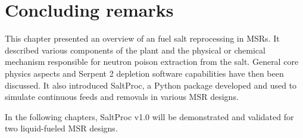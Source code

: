 \section{Concluding remarks}
This chapter presented an overview of an fuel salt reprocessing in 
\glspl{MSR}. It described various components of the plant and the physical 
or chemical mechanism responsible for neutron poison extraction from the 
salt. General core physics aspects and Serpent 2 depletion software 
capabilities have then been discussed. It also introduced SaltProc, a Python 
package developed and used to simulate continuous feeds and removals in 
various \gls{MSR} designs.

In the following chapters, SaltProc v1.0 will be demonstrated and validated 
for two liquid-fueled \gls{MSR} designs.